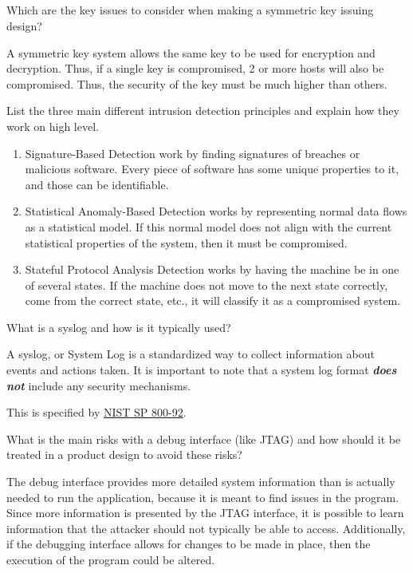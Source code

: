 \begin{questions}
\begin{parts}
  \part{} Which are the key issues to consider when making a symmetric key issuing design?
    \begin{solution}
      A symmetric key system allows the same key to be used for encryption and decryption.
      Thus, if a single key is compromised, 2 or more hosts will also be compromised.
      Thus, the security of the key must be much higher than others.
    \end{solution}
  \end{parts}

\question{} List the three main different intrusion detection principles and explain how they work on high level.
  \begin{solution}
    \begin{enumerate}[noitemsep]
    \item Signature-Based Detection work by finding signatures of breaches or malicious software.
      Every piece of software has some unique properties to it, and those can be identifiable.
    \item Statistical Anomaly-Based Detection works by representing normal data flows as a statistical model.
      If this normal model does not align with the current statistical properties of the system, then it must be compromised.
    \item Stateful Protocol Analysis Detection works by having the machine be in one of several states.
      If the machine does not move to the next state correctly, come from the correct state, etc., it will classify it as a compromised system.
    \end{enumerate}
  \end{solution}

\question{} What is a syslog and how is it typically used?
  \begin{solution}
    A syslog, or System Log is a standardized way to collect information about events and actions taken.
    It is important to note that a system log format \emph{\textbf{does not}} include any security mechanisms.

    This is specified by \href{https://nvlpubs.nist.gov/nistpubs/Legacy/SP/nistspecialpublication800-92.pdf}{NIST SP 800-92}.
  \end{solution}

\question{} What is the main risks with a debug interface (like JTAG) and how should it be treated in a product design to avoid these risks?
  \begin{solution}
    The debug interface provides more detailed system information than is actually needed to run the application, because it is meant to find issues in the program.
    Since more information is presented by the JTAG interface, it is possible to learn information that the attacker should not typically be able to access.
    Additionally, if the debugging interface allows for changes to be made in place, then the execution of the program could be altered.
  \end{solution}


\end{questions}
